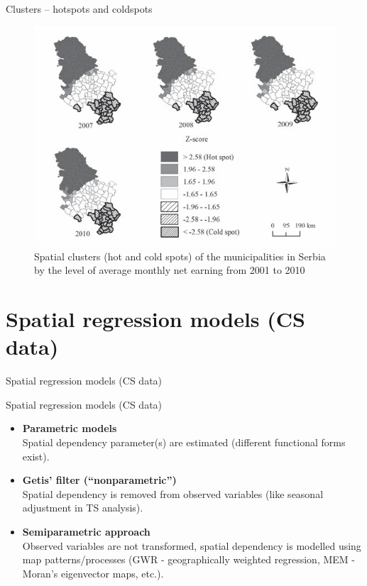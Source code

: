 \documentclass{beamer}
\begin{document}
\begin{frame}{Clusters -- hotspots and coldspots}
\begin{figure}
	\includegraphics[width=.7\textwidth]{IMG/sp_coldspot.PNG}
	\caption{Spatial clusters (hot and cold spots) of the municipalities in Serbia by the level of average monthly net earning from 2001 to 2010}
\end{figure}
\end{frame}
\section{Spatial regression models (CS data)}
\begin{frame}{Spatial regression models (CS data)}
\end{frame}
\begin{frame}{Spatial regression models (CS data)}

\begin{itemize}
    \item \textbf{Parametric models} \\ \smallskip
    Spatial dependency parameter(s) are estimated (different functional forms exist).\\
    \bigskip
    \item \textbf{Getis' filter (``nonparametric'')}\\ \smallskip
    Spatial dependency is removed from observed variables (like seasonal adjustment in TS analysis).\\
    \bigskip
    \item \textbf{Semiparametric approach} \\ \smallskip
    Observed variables are not transformed, spatial dependency is modelled using map patterns/processes (GWR - geographically weighted regression, MEM - Moran's eigenvector maps, etc.).
\end{itemize}

\end{frame}
\end{document}
